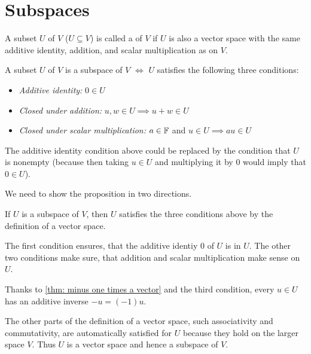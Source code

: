 \section{Subspaces}

\begin{mydef} [subspace]
  A subset $U$ of $V$ ($U \subseteq V$) is called a  of $V$ if $U$ is also a vector space with the same additive identity, addition, and scalar multiplication as on $V$.
\end{mydef}

\begin{thm} 
  A subset $U$ of $V$ is a subspace of $V$ $\iff$ $U$ satisfies the following three conditions:
  \begin{itemize}
    \item \emph{Additive identity:}
    $0 \in U$
    \item \emph{Closed under addition:}
    $u,w \in U \implies u+w \in U$
    \item \emph{Closed under scalar multiplication:}
    $a \in \mathbb{F}$ and $u \in U \implies au \in U$
  \end{itemize}
  The additive identity condition above could be replaced by the condition that $U$ is nonempty (because then taking $u \in U$ and multiplying it by $0$ would imply that $0\in U$).
\end{thm}
\begin{prf} We need to show the proposition in two directions.
  \begin{description}
    \item{} If $U$ is a subspace of $V$, then $U$ satisfies the three conditions above by the definition of a vector space.
    \item{} The first condition ensures, that the additive identiy $0$ of $U$ is in $U$. The other two conditions make sure, that addition and scalar multiplication make sense on $U$.

    Thanks to \ref{thm: minus one times a vector} and the third condition, every $u \in U$ has an additive inverse $-u = (-1) u$.

    The other parts of the definition of a vector space, such associativity and commutativity, are automatically satisfied for $U$ because they hold on the larger space $V$. Thus $U$ is a vector space and hence a subspace of $V$.
  \end{description}
  \vspace*{-\baselineskip}
\end{prf}

